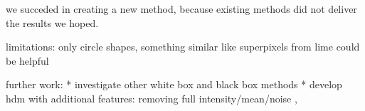 we succeded in creating a new method, because existing methods did not deliver the results we hoped.

limitations: only circle shapes, something similar like superpixels from lime could be helpful

further work:
* investigate other white box and black box methods
* develop hdm with additional features: removing full intensity/mean/noise ,
